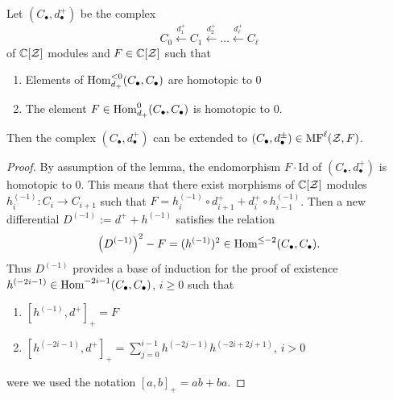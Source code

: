 \documentclass[10pt]{amsart}
\begin{document}
\begin{lemma}\label{lem: ext MF} Let $(C_\bullet,d_\bullet^+)$ be the complex
$$C_0\xleftarrow{d_1^+}C_1\xleftarrow{d_2^+}\dots\xleftarrow{d_\ell^+} C_\ell$$
of $\mathbb{C}[\mathcal{Z}]$ modules and $F\in \mathbb{C}[\mathcal{Z}]$ such that
\begin{enumerate}
\item Elements of $\mathop{{\rm Hom}}\nolimits_{d_+}^{<0}(C_\bullet,C_\bullet)$ are homotopic to $0$
\item The element $F\in \mathop{{\rm Hom}}\nolimits_{d_+}^{0}(C_\bullet,C_\bullet)$ is homotopic to $0$.
\end{enumerate}
Then the complex $(C_\bullet,d_\bullet^+)$ can be extended to $(C_\bullet,d^\pm_\bullet)\in \mathrm{MF}^{\ell}(\mathcal{Z},F)$.
\end{lemma}
\begin{proof}
By assumption of the lemma, the  endomorphism $F\cdot \mathrm{Id}$  of $(C_\bullet,d_\bullet^+)$ is homotopic to  $0$. This means that there exist morphisms of $\mathbb{C}[\mathcal{Z}]$ modules
$h^{(-1)}_i: C_i\to C_{i+1}$ such that $F=h^{(-1)}_i\circ d_{i+1}^++d_i^+\circ h^{(-1)}_{i-1}$. Then a new differential $D^{(-1)}:=d^++h^{(-1)}$ satisfies the relation
$$ \left(D^{(-1)}\right)^2-F =(h^{(-1)})^2\in \mathop{{\rm Hom}}\nolimits^{\leq-2}(C_\bullet,C_\bullet).$$
Thus $D^{(-1)}$ provides a base
of induction for the proof of existence $h^{(-2i-1)}\in \mathop{{\rm Hom}}\nolimits^{-2i-1}(C_\bullet,C_\bullet)$, $i\ge 0$ such that
\begin{enumerate}
\item $[h^{(-1)},d^+]_+=F$
\item $[h^{(-2i-1)},d^+]_+=\sum_{j=0}^{i-1} h^{(-2j-1)} h^{(-2i+2j+1)}$, $i>0$
\end{enumerate}
were we used the notation $[a,b]_+=ab+ba$.


\end{proof}
\end{document}
